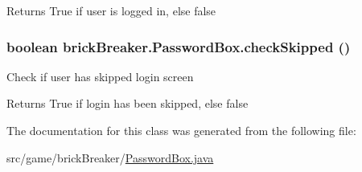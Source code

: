\begin{DoxyReturn}{Returns}
True if user is logged in, else false 
\end{DoxyReturn}
\hypertarget{classbrick_breaker_1_1_password_box_a88b47539fc6a2f7b7e51a8258d5821de}{
\subsubsection[{checkSkipped}]{\setlength{\rightskip}{0pt plus 5cm}boolean brickBreaker.PasswordBox.checkSkipped ()}}
\label{classbrick_breaker_1_1_password_box_a88b47539fc6a2f7b7e51a8258d5821de}
Check if user has skipped login screen

\begin{DoxyReturn}{Returns}
True if login has been skipped, else false 
\end{DoxyReturn}


The documentation for this class was generated from the following file:\begin{DoxyCompactItemize}
\item 
src/game/brickBreaker/\hyperlink{_password_box_8java}{PasswordBox.java}\end{DoxyCompactItemize}
